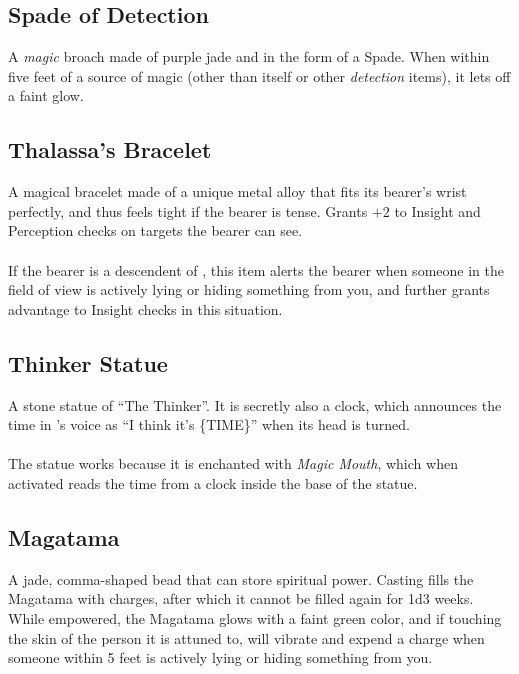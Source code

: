 \subsection{Spade of Detection}
\label{items:detectspade}
A \textit{magic} broach made of purple jade and in the form of a Spade. When within five feet of a source of magic (other than itself or other \textit{detection} items), it lets off a faint glow.

\subsection{Thalassa's Bracelet}
\label{items:bracelet}
A magical bracelet made of a unique metal alloy that fits its bearer's wrist perfectly, and thus feels tight if the bearer is tense. Grants $+2$ to Insight and Perception checks on targets the bearer can see.\\
\\
If the bearer is a descendent of , this item alerts the bearer when someone in the field of view is actively lying or hiding something from you, and further grants advantage to Insight checks in this situation.

\subsection{Thinker Statue}
\label{items:thinker}
A stone statue of ``The Thinker''. It is secretly also a clock, which announces the time in 's voice as ``I think it's \{TIME\}'' when its head is turned. \\
\\
The statue works because it is enchanted with \textit{Magic Mouth}, which when activated reads the time from a clock inside the base of the statue.



\subsection{Magatama}
\label{items:magatama}
A jade, comma-shaped bead that can store spiritual power. Casting  fills the Magatama with charges, after which it cannot be filled again for 1d3 weeks. While empowered, the Magatama glows with a faint green color, and if touching the skin of the person it is attuned to, will vibrate and expend a charge when someone within 5 feet is actively lying or hiding something from you.